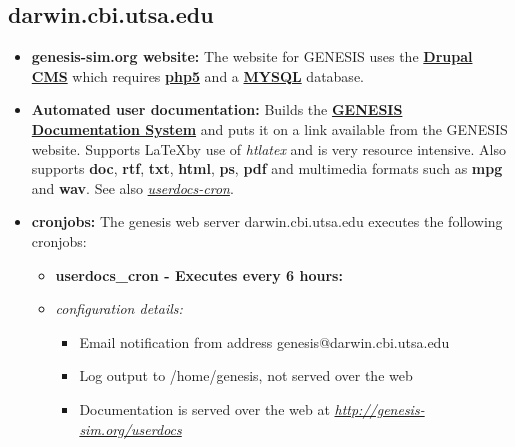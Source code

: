 \documentclass[12pt]{article}
\begin{document}
\subsection*{\bf darwin.cbi.utsa.edu}

\begin{itemize}

\item {\bf genesis-sim.org website:} The website for GENESIS uses the \href{http://drupal.org/}{\bf Drupal CMS} which requires \href{http://www.php.net/}{\bf php5} and a \href{http://www.mysql.com/}{\bf MYSQL} database.

\item {\bf Automated user documentation:} Builds the \href{../documentation-overview/documentation-overview.tex}{\bf GENESIS Documentation System} and puts it on a link available from the GENESIS website.  Supports \LaTeX by use of {\it htlatex} and is very resource intensive.  Also supports {\bf doc}, {\bf rtf}, {\bf txt}, {\bf html}, {\bf ps}, {\bf pdf} and multimedia formats such as {\bf mpg} and {\bf wav}.  See also \href{../userdocs-cron/userdocs-cron.tex}{\it userdocs-cron}.


\item {\bf cronjobs:} The genesis web server darwin.cbi.utsa.edu executes the following cronjobs:
\begin{itemize}
	\item {\bf userdocs\_cron - Executes every 6 hours:}
	\item {\it configuration details:} 
	\begin{itemize} 
	\item Email notification from address genesis@darwin.cbi.utsa.edu
	\item Log output to /home/genesis, not served over the web
	\item Documentation is served over the web at \href{http://genesis-sim.org/userdocs}{\it http://genesis-sim.org/userdocs}
	\end{itemize}
\end{itemize}
\end{itemize}
\end{document}
